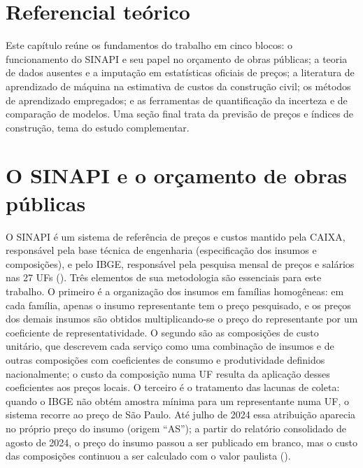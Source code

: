 
\section{Referencial teórico}

Este capítulo reúne os fundamentos do trabalho em cinco blocos: o funcionamento do SINAPI 
e seu papel no orçamento de obras públicas; a teoria de dados ausentes e a imputação em 
estatísticas oficiais de preços; a literatura de aprendizado de máquina na estimativa de 
custos da construção civil; os métodos de aprendizado empregados; e as ferramentas de 
quantificação da incerteza e de comparação de modelos. Uma seção final trata da previsão 
de preços e índices de construção, tema do estudo complementar.

\section{O SINAPI e o orçamento de obras públicas}

O SINAPI é um sistema de referência de preços e custos mantido pela CAIXA, responsável 
pela base técnica de engenharia (especificação dos insumos e composições), e pelo IBGE, 
responsável pela pesquisa mensal de preços e salários nas 27 UFs (). Três elementos de sua metodologia são essenciais para este trabalho. O primeiro é 
a organização dos insumos em famílias homogêneas: em cada família, apenas o insumo 
representante tem o preço pesquisado, e os preços dos demais insumos são obtidos 
multiplicando-se o preço do representante por um coeficiente de representatividade. 
O segundo são as composições de custo unitário, que descrevem cada serviço como uma 
combinação de insumos e de outras composições com coeficientes de consumo e produtividade 
definidos nacionalmente; o custo da composição numa UF resulta da aplicação desses 
coeficientes aos preços locais. O terceiro é o tratamento das lacunas de coleta: quando 
o IBGE não obtém amostra mínima para um representante numa UF, o sistema recorre ao preço 
de São Paulo. Até julho de 2024 essa atribuição aparecia no próprio preço do insumo 
(origem “AS”); a partir do relatório consolidado de agosto de 2024, o preço do insumo 
passou a ser publicado em branco, mas o custo das composições continuou a ser calculado 
com o valor paulista ().

